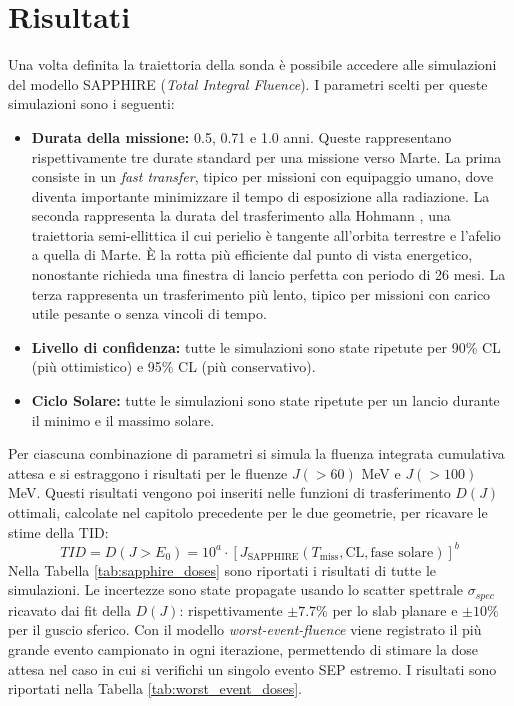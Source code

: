 \documentclass[12pt]{report}
\begin{document}
\section{Risultati}
Una volta definita la traiettoria della sonda è possibile accedere alle simulazioni del modello SAPPHIRE (\textit{Total Integral Fluence}). I parametri scelti per queste simulazioni sono i seguenti: 

\begin{itemize}[nosep]
    \item [-] \textbf{Durata della missione:} 0.5, 0.71 e 1.0 anni. Queste rappresentano rispettivamente tre durate standard per una missione verso Marte. La prima consiste in un \textit{fast transfer}, tipico per missioni con equipaggio umano, dove diventa importante minimizzare il tempo di esposizione alla radiazione. La seconda rappresenta la durata del trasferimento alla Hohmann \cite{marspedia_hohmann}, una traiettoria semi-ellittica il cui perielio è tangente all'orbita terrestre e l'afelio a quella di Marte. È  la rotta più efficiente dal punto di vista energetico, nonostante richieda una finestra di lancio perfetta con periodo di 26 mesi. La terza rappresenta un trasferimento più lento, tipico per missioni con carico utile pesante o senza vincoli di tempo. 
    \item [-] \textbf{Livello di confidenza:} tutte le simulazioni sono state ripetute per 90\% CL (più ottimistico) e 95\% CL (più conservativo).
    \item [-] \textbf{Ciclo Solare:} tutte le simulazioni sono state ripetute per un lancio durante il minimo e il massimo solare.  
\end{itemize}
Per ciascuna combinazione di parametri si simula la fluenza integrata cumulativa attesa e si estraggono i risultati per le fluenze $J(>60)$ MeV e $J(>100)$ MeV. 
\clearpage
\noindent Questi risultati vengono poi inseriti nelle funzioni di trasferimento $D(J)$ ottimali, calcolate nel capitolo precedente per le due geometrie, per ricavare le stime della TID: 
\begin{equation}
    TID = D(J>E_0) = 10^a \cdot [J_{\text{SAPPHIRE}}(T_{\text{miss}},\text{CL},\text{fase solare})]^b
\end{equation}
Nella Tabella \ref{tab:sapphire_doses} sono riportati i risultati di tutte le simulazioni. Le incertezze sono state propagate usando lo scatter spettrale $\sigma_{spec}$ ricavato dai fit della $D(J)$: rispettivamente $\pm 7.7\%$ per lo slab planare e $\pm 10\%$ per il guscio sferico. Con il modello \textit{worst-event-fluence} viene registrato il più grande evento campionato in ogni iterazione, permettendo di stimare la dose attesa nel caso in cui si verifichi un singolo evento SEP estremo. I risultati sono riportati nella Tabella \ref{tab:worst_event_doses}.  
\end{document}
